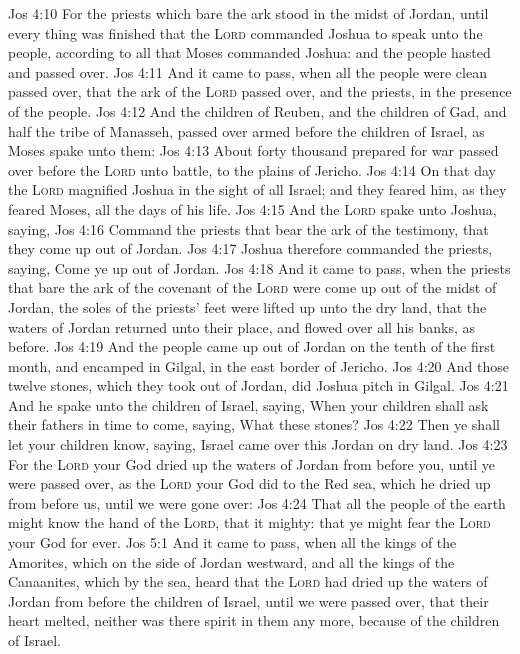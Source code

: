 \vs Jos 4:10 For the priests which bare the ark stood in the midst of Jordan, until every thing was finished that the \textsc{Lord} commanded Joshua to speak unto the people, according to all that Moses commanded Joshua: and the people hasted and passed over.
\vs Jos 4:11 And it came to pass, when all the people were clean passed over, that the ark of the \textsc{Lord} passed over, and the priests, in the presence of the people.
\vs Jos 4:12 And the children of Reuben, and the children of Gad, and half the tribe of Manasseh, passed over armed before the children of Israel, as Moses spake unto them:
\vs Jos 4:13 About forty thousand prepared for war passed over before the \textsc{Lord} unto battle, to the plains of Jericho.
\vs Jos 4:14 On that day the \textsc{Lord} magnified Joshua in the sight of all Israel; and they feared him, as they feared Moses, all the days of his life.
\vs Jos 4:15 And the \textsc{Lord} spake unto Joshua, saying,
\vs Jos 4:16 Command the priests that bear the ark of the testimony, that they come up out of Jordan.
\vs Jos 4:17 Joshua therefore commanded the priests, saying, Come ye up out of Jordan.
\vs Jos 4:18 And it came to pass, when the priests that bare the ark of the covenant of the \textsc{Lord} were come up out of the midst of Jordan,  the soles of the priests' feet were lifted up unto the dry land, that the waters of Jordan returned unto their place, and flowed over all his banks, as  before.
\vs Jos 4:19 And the people came up out of Jordan on the tenth  of the first month, and encamped in Gilgal, in the east border of Jericho.
\vs Jos 4:20 And those twelve stones, which they took out of Jordan, did Joshua pitch in Gilgal.
\vs Jos 4:21 And he spake unto the children of Israel, saying, When your children shall ask their fathers in time to come, saying, What  these stones?
\vs Jos 4:22 Then ye shall let your children know, saying, Israel came over this Jordan on dry land.
\vs Jos 4:23 For the \textsc{Lord} your God dried up the waters of Jordan from before you, until ye were passed over, as the \textsc{Lord} your God did to the Red sea, which he dried up from before us, until we were gone over:
\vs Jos 4:24 That all the people of the earth might know the hand of the \textsc{Lord}, that it  mighty: that ye might fear the \textsc{Lord} your God for ever.
\vs Jos 5:1 And it came to pass, when all the kings of the Amorites, which  on the side of Jordan westward, and all the kings of the Canaanites, which  by the sea, heard that the \textsc{Lord} had dried up the waters of Jordan from before the children of Israel, until we were passed over, that their heart melted, neither was there spirit in them any more, because of the children of Israel.
